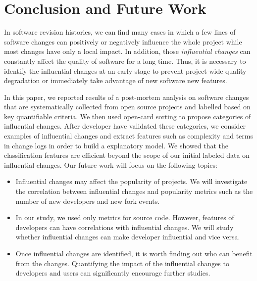 \section{Conclusion and Future Work}
\label{sec:conclusion}

In software revision histories, we can find many cases in which a few lines of
software changes can positively or negatively influence the whole project
while most changes have only a local impact. In addition, those
\emph{influential changes} can constantly affect the quality of software for a
long time. Thus, it is necessary to identify the influential changes at an
early stage to prevent project-wide quality degradation or immediately
take advantage of new software new features.

In this paper, we reported results of a post-mortem analysis on \numChanges
software changes that are systematically collected from \numSubjects open
source projects  and labelled based on key quantifiable criteria. We then
used open-card sorting to propose categories of influential changes.
After developer have validated these categories, we consider examples of
influential changes and extract features such as 
complexity and terms in change logs in order to build a explanatory model.
We showed that the classification features are efficient beyond the scope
of our initial labeled data on influential changes. 
Our future work will focus on the following topics: 

\begin{itemize}
  \item Influential changes may affect the popularity of projects. We will
  investigate the correlation between influential changes and popularity metrics
  such as the number of new developers and new fork events.
  \item In our study, we used only metrics for source code. However, features of
  developers can have correlations with influential changes. We will study
  whether influential changes can make developer influential and vice versa.
  \item Once influential changes are identified, it is worth finding out who can
  benefit from the changes. Quantifying the impact of the influential changes to
  developers and users can significantly encourage further studies.
\end{itemize}
